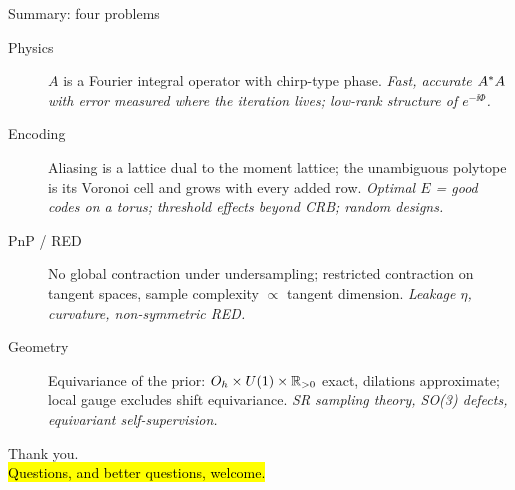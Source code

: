 \begin{frame}{Summary: four problems}
\footnotesize
\begin{description}
\item[Physics] $A$ is a Fourier integral operator with chirp-type phase. \emph{Fast, accurate $A^{*} A$ with error measured where the iteration lives; low-rank structure of $e^{-\ii\Phi}$.}
\item[Encoding] Aliasing is a lattice dual to the moment lattice; the unambiguous polytope is its Voronoi cell and grows with every added row. \emph{Optimal $E$ = good codes on a torus; threshold effects beyond CRB; random designs.}
\item[PnP / RED] No global contraction under undersampling; restricted contraction on tangent spaces, sample complexity $\propto$ tangent dimension. \emph{Leakage $\eta$, curvature, non-symmetric RED.}
\item[Geometry] Equivariance of the prior: $O_h\times U(1)\times\mathbb R_{>0}$ exact, dilations approximate; local gauge excludes shift equivariance. \emph{SR sampling theory, SO(3) defects, equivariant self-supervision.}
\end{description}
\pause
\centering Thank you.\\\hl{Questions, and better questions, welcome.}
\end{frame}
